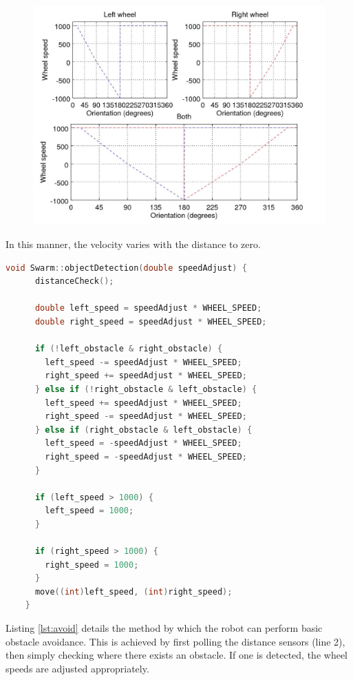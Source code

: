 \begin{figure}[h]
	\begin{minipage}{.75\textwidth}
		\includegraphics[width=1.2\linewidth]{control}
		\label{fig:control}
	\end{minipage}
\end{figure}

In this manner, the velocity varies with the distance to zero.

\begin{lstlisting}[language=C++, caption={Object avoidance},label={lst:avoid}]
	void Swarm::objectDetection(double speedAdjust) {
	  distanceCheck();

	  double left_speed = speedAdjust * WHEEL_SPEED;
	  double right_speed = speedAdjust * WHEEL_SPEED;

	  if (!left_obstacle & right_obstacle) {
	    left_speed -= speedAdjust * WHEEL_SPEED;
	    right_speed += speedAdjust * WHEEL_SPEED;
	  } else if (!right_obstacle & left_obstacle) {
	    left_speed += speedAdjust * WHEEL_SPEED;
	    right_speed -= speedAdjust * WHEEL_SPEED;
	  } else if (right_obstacle & left_obstacle) {
	    left_speed = -speedAdjust * WHEEL_SPEED;
	    right_speed = -speedAdjust * WHEEL_SPEED;
	  }

	  if (left_speed > 1000) {
	    left_speed = 1000;
	  }

	  if (right_speed > 1000) {
	    right_speed = 1000;
	  }
	  move((int)left_speed, (int)right_speed);
	}
\end{lstlisting}

Listing \ref{lst:avoid} details the method by which the robot can perform basic obstacle avoidance. This is achieved by first polling the distance sensors (line 2), then simply checking where there exists an obstacle. If one is detected, the wheel speeds are adjusted appropriately.

